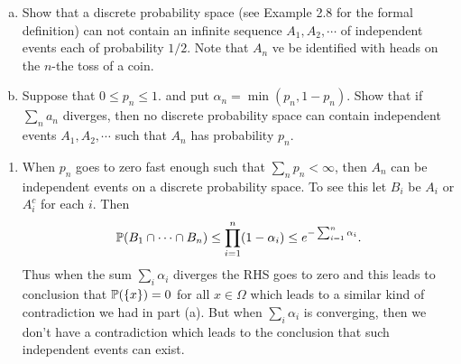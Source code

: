 \begin{problem}
	\label{prob:DiscreteSpaceIndependentEvents}
	\begin{enumerate}[(a)]
		\item Show that a discrete probability space (see Example 2.8 for the formal definition) can not contain an infinite sequence $ A_1,A_2,\cdots $ of independent events each of probability $ 1/2 $. Note that $ A_n $ ve be identified with heads on the $ n $-the toss of a coin. 
		\item Suppose that $ 0\leq p_n \leq 1 $. and put $ \alpha_n = \min(p_n,1-p_n) $. Show that if $ \sum_n a_n $ diverges, then no discrete probability space can contain independent events $ A_1,A_2,\cdots $ such that $ A_n $ has probability $ p_n $.
	\end{enumerate}
\end{problem}

\begin{solution}
	\begin{enumerate}
		Let $ \set{x} \subset \Omega $. Then $ x $ belongs to only one of the four disjoint sets below
		\[ A_1\cap A_2,\quad A_1^c\cap A_2 \quad A_1\cap A_2^c,\quad A_1^c \cap A_2^c. \]
		Observe that the probability of each of these events are $ 1/4 $ (noting that if $ A,B $ are independent then $ A^c, B^c $ are independent as well). So $ \set{x} $ must have probability $ 1/4 $ at most. Now consider the events $ A_1,A_2,A_3 $. Then $ x $ should belong to only one of the disjoint events below
		\begin{align*}
			A_1\cap A_2\cap A_3, \quad A_1\cap A_2^c\cap A_3, \quad A_1\cap A_2\cap A_3^c, \quad A_1\cap A_2^c\cap A_3^c, \\
			A_1^c\cap A_2\cap A_3, \quad A_1^c\cap A_2^c\cap A_3, \quad A_1^c\cap A_2\cap A_3^c, \quad A_1^c\cap A_2^c\cap A_3^c. 
		\end{align*}
		Since $ A_1,A_2,A_3 $ are independent events the probability of each of the events above are $ 1/8 $. So $ \set{x} $ can have probability $ 1/8 $ at most. Continuing this we will get $ \prob(\set{x}) = 0 $ for all $ x\in \Omega $. On the other hand since $ \Omega $ is countable then 
		\[ 1 = \prob(\Omega ) = \sum_{x\in \Omega} \prob(\set{x}) = 0 \]  
		which is a contradiction. 
		
		
		\item When $ p_n $ goes to zero fast enough such that $ \sum_n p_n <\infty $, then $ A_n $ can be independent events on a discrete probability space. To see this let $ B_i $ be $ A_i $ or $ A_i^c $ for each $ i $. Then 
		\[ \mathbb{P}(B_1\cap \cdots\cap B_n) \leq \prod_{i=1}^{n}(1-\alpha_i) \leq e^{-\sum_{i=1}^{n}\alpha_i}. \]
		Thus when the sum $ \sum_i \alpha_i $ diverges the RHS goes to zero and this leads to conclusion that $ \prob(\set{x}) = 0 $ for all $ x\in \Omega $ which leads to a similar kind of contradiction we had in part (a). But when $ \sum_i\alpha_i $ is converging, then we don't have a contradiction which leads to the conclusion that such independent events can exist.
	\end{enumerate}
\end{solution}

